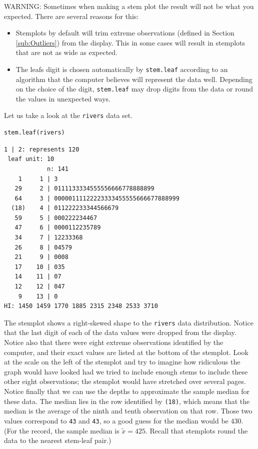 \documentclass[captions=tableheading]{scrbook}
\begin{document}
WARNING: Sometimes when making a stem plot the result will not be what you expected. There are several reasons for this: 

\begin{itemize}
\item Stemplots by default will trim extreme observations (defined in Section \ref{sub:Outliers}) from the display. This in some cases will result in stemplots that are not as wide as expected.
\item The leafs digit is chosen automatically by \texttt{stem.leaf} according to an algorithm that the computer believes will represent the data well. Depending on the choice of the digit, \texttt{stem.leaf} may drop digits from the data or round the values in unexpected ways.
\end{itemize}

Let us take a look at the \texttt{rivers} data set\label{ite:stemplot-rivers}.


\begin{verbatim}
stem.leaf(rivers)
\end{verbatim}


\begin{verbatim}
1 | 2: represents 120
 leaf unit: 10
            n: 141
    1     1 | 3
   29     2 | 0111133334555556666778888899
   64     3 | 00000111122223333455555666677888999
  (18)    4 | 011222233344566679
   59     5 | 000222234467
   47     6 | 0000112235789
   34     7 | 12233368
   26     8 | 04579
   21     9 | 0008
   17    10 | 035
   14    11 | 07
   12    12 | 047
    9    13 | 0
HI: 1450 1459 1770 1885 2315 2348 2533 3710
\end{verbatim}

The stemplot shows a right-skewed shape to the \texttt{rivers} data distribution. Notice that the last digit of each of the data values were dropped from the display. Notice also that there were eight extreme observations identified by the computer, and their exact values are listed at the bottom of the stemplot. Look at the scale on the left of the stemplot and try to imagine how ridiculous the graph would have looked had we tried to include enough stems to include these other eight observations; the stemplot would have stretched over several pages. Notice finally that we can use the depths to approximate the sample median for these data. The median lies in the row identified by \texttt{(18)}, which means that the median is the average of the ninth and tenth observation on that row. Those two values correspond to \texttt{43} and \texttt{43}, so a good guess for the median would be 430. (For the record, the sample median is \(\widetilde{x}=425\). Recall that stemplots round the data to the nearest stem-leaf pair.) 
\end{document}
